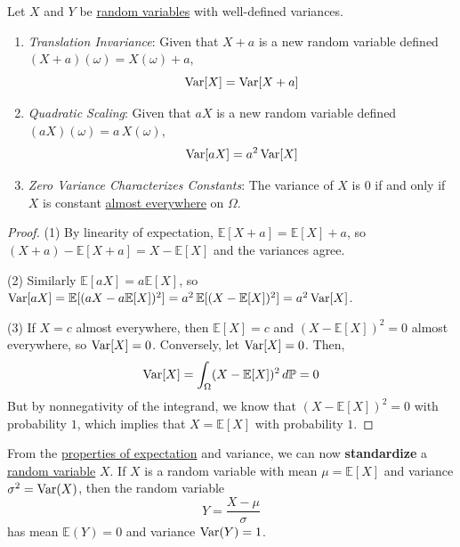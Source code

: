   \begin{lemma}
    \label{thm:properties-of-variance}
    Let $X$ and $Y$ be \hyperref[def:random-variable]{random variables} with well-defined variances. 
    \begin{enumerate}
      \item \textit{Translation Invariance}: Given that $X + a$ is a new random variable defined $(X + a)(\omega) = X(\omega) + a$, 
      \begin{equation}
        \operatorname{Var}[X] = \operatorname{Var}[X + a]
      \end{equation}
      \item \textit{Quadratic Scaling}: Given that $aX$ is a new random variable defined $(aX)(\omega) = a\,X(\omega)$, 
      \begin{equation}
        \operatorname{Var}[aX] = a^2 \operatorname{Var}[X]
      \end{equation}
      \item \textit{Zero Variance Characterizes Constants}: The variance of $X$ is $0$ if and only if $X$ is constant \hyperref[mt-def:almost_everywhere]{almost everywhere} on $\Omega$. 
    \end{enumerate}
  \end{lemma}
  \begin{proof}
    (1) By linearity of expectation, $\mathbb{E}[X + a] = \mathbb{E}[X] + a$, so $(X + a) - \mathbb{E}[X + a] = X - \mathbb{E}[X]$ and the variances agree. 

    (2) Similarly $\mathbb{E}[aX] = a \mathbb{E}[X]$, so $\operatorname{Var}[aX] = \mathbb{E}[(aX - a\mathbb{E}[X])^2] = a^2 \, \mathbb{E}[(X - \mathbb{E}[X])^2] = a^2 \operatorname{Var}[X]$. 

    (3) If $X = c$ almost everywhere, then $\mathbb{E}[X] = c$ and $(X - \mathbb{E}[X])^2 = 0$ almost everywhere, so $\operatorname{Var}[X] = 0$. Conversely, let $\operatorname{Var}[X] = 0$. Then, 
    \begin{equation}
      \operatorname{Var}[X] = \int_\Omega (X - \mathbb{E}[X])^2 \, d\mathbb{P} = 0
    \end{equation}
    But by nonnegativity of the integrand, we know that $(X - \mathbb{E}[X])^2 = 0$ with probability $1$, which implies that $X = \mathbb{E}[X]$ with probability $1$. 
  \end{proof}

  From the \hyperref[thm:properties-of-expectation]{properties of expectation} and variance, we can now \textbf{standardize} a \hyperref[def:random-variable]{random variable} $X$. If $X$ is a random variable with mean $\mu = \mathbb{E}[X]$ and variance $\sigma^2 = \operatorname{Var}(X)$, then the random variable 
  \begin{equation}
    Y = \frac{X - \mu}{\sigma}
  \end{equation}
  has mean $\mathbb{E}(Y) = 0$ and variance $\operatorname{Var}(Y) = 1$. 

